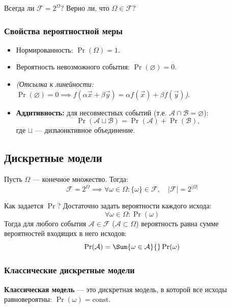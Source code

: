 \begin{exercise}
    Всегда ли $\mathcal{F} = 2^{\Omega}$? Верно ли, что $\Omega \in \mathcal{F}$?
\end{exercise}

\subsubsection{Свойства вероятностной меры}

\begin{itemize}
    \item Нормированность: $\Pr(\Omega) = 1$.
    \item Вероятность невозможного события: $\Pr(\varnothing) = 0$. 
    \item \textit{(Отсылка к линейности: $\Pr(\varnothing) = 0 \implies f(\alpha \vec{x} + \beta \vec{y}) = \alpha f(\vec{x}) + \beta f(\vec{y})$)}.
    \item \textbf{Аддитивность:} для несовместных событий (т.е. $\mathcal{A} \cap \mathcal{B} = \varnothing$):
    \[
        \Pr(\mathcal{A} \sqcup \mathcal{B}) = \Pr(\mathcal{A}) + \Pr(\mathcal{B}),
    \]
    где $\sqcup$ --- дизъюнктивное объединение.
\end{itemize}

\subsection{Дискретные модели}

Пусть $\Omega$ --- конечное множество. Тогда:
\[
    \mathcal{F} = 2^{\Omega} \implies \forall \omega \in \Omega \colon \{\omega\} \in \mathcal{F}, \quad |\mathcal{F}| = 2^{|\Omega|}
\]

Как задается $\Pr$? Достаточно задать вероятности каждого исхода:
\[
    \forall \omega \in \Omega \colon \Pr(\omega)
\]
Тогда для любого события $\mathcal{A} \in \mathcal{F}$ ($\mathcal{A} \subset \Omega$) вероятность равна сумме вероятностей входящих в него исходов:
\[
    \Pr(\mathcal{A}) = \Sum{\omega \in \mathcal{A}}{} \Pr(\omega)
\]

\subsubsection{Классические дискретные модели}

\begin{definition}
    \textbf{Классическая модель} --- это дискретная модель, в которой все исходы равновероятны: $\Pr(\omega) = \text{const}$.
\end{definition}

